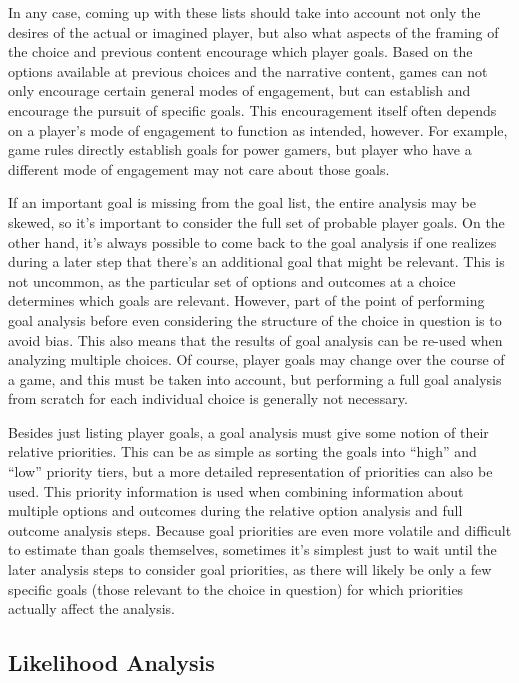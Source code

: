 In any case, coming up with these lists should take into account not only the desires of the actual or imagined player, but also what aspects of the framing of the choice and previous content encourage which player goals.
%
Based on the options available at previous choices and the narrative content, games can not only encourage certain general modes of engagement, but can establish and encourage the pursuit of specific goals.
%
This encouragement itself often depends on a player's mode of engagement to function as intended, however.
%
For example, game rules directly establish goals for power gamers, but player who have a different mode of engagement may not care about those goals.


If an important goal is missing from the goal list, the entire analysis may be skewed, so it's important to consider the full set of probable player goals.
%
On the other hand, it's always possible to come back to the goal analysis if one realizes during a later step that there's an additional goal that might be relevant. 
%
This is not uncommon, as the particular set of options and outcomes at a choice  determines which goals are relevant.
%
However, part of the point of performing goal analysis before even considering the structure of the choice in question is to avoid bias.
%
This also means that the results of goal analysis can be re-used when analyzing multiple choices.
%
Of course, player goals may change over the course of a game, and this must be taken into account, but performing a full goal analysis from scratch for each individual choice is generally not necessary.


Besides just listing player goals, a goal analysis must give some notion of their relative priorities.
%
This can be as simple as sorting the goals into ``high'' and ``low'' priority tiers, but a more detailed representation of priorities can also be used.
%
This priority information is used when combining information about multiple options and outcomes during the relative option analysis and full outcome analysis steps.
%
Because goal priorities are even more volatile and difficult to estimate than goals themselves, sometimes it's simplest just to wait until the later analysis steps to consider goal priorities, as there will likely be only a few specific goals (those relevant to the choice in question) for which priorities actually affect the analysis.


\subsection{Likelihood Analysis}

